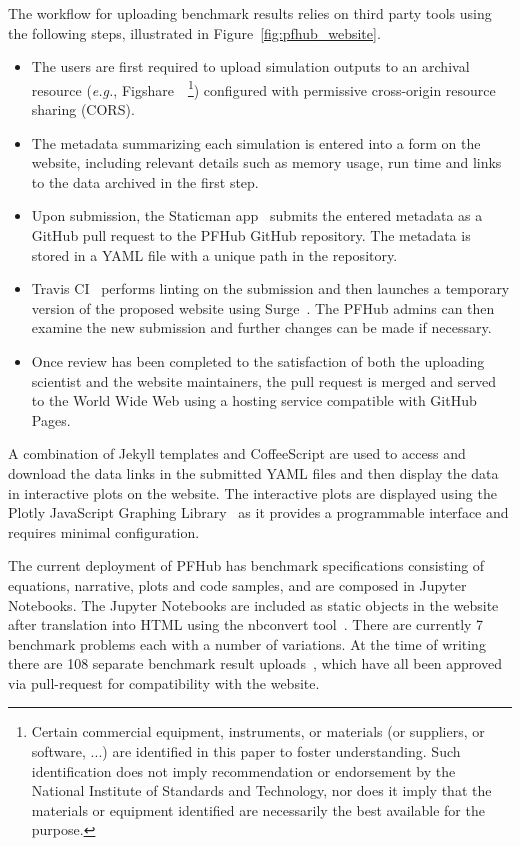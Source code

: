 \documentclass{jors}
\begin{document}
The workflow for uploading benchmark results relies on third party
tools using the following steps, illustrated in
Figure~\ref{fig:pfhub_website}.
\begin{itemize}
  \item The users are first required to upload simulation outputs to
    an archival resource (\emph{e.g.},
    Figshare~\cite{figshare}~\footnote{Certain commercial equipment,
      instruments, or materials (or suppliers, or software, ...) are
      identified in this paper to foster understanding. Such
      identification does not imply recommendation or endorsement by
      the National Institute of Standards and Technology, nor does it
      imply that the materials or equipment identified are necessarily
      the best available for the purpose.\label{disclaimer}})
    configured with permissive cross-origin resource sharing (CORS).
  \item The metadata summarizing each simulation is entered into a
    form on the website, including relevant details such as memory
    usage, run time and links to the data archived in the first step.
  \item Upon submission, the Staticman app~\cite{staticman} submits
    the entered metadata as a GitHub pull request to the PFHub GitHub
    repository.  The metadata is stored in a YAML file with a unique
    path in the repository.
  \item Travis CI~\cite{travis} performs linting on the submission and
    then launches a temporary version of the proposed website using
    Surge~\cite{surge}. The PFHub admins can then examine the new
    submission and further changes can be made if necessary.
  \item Once review has been completed to the satisfaction of both the
    uploading scientist and the website maintainers, the pull request
    is merged and served to the World Wide Web using a hosting service
    compatible with GitHub Pages.
\end{itemize}
A combination of Jekyll templates and CoffeeScript are used to access
and download the data links in the submitted YAML files and then
display the data in interactive plots on the website. The interactive
plots are displayed using the Plotly JavaScript Graphing
Library~\cite{plotly} as it provides a programmable interface and
requires minimal configuration.

The current deployment of PFHub has benchmark specifications
consisting of equations, narrative, plots and code samples, and are
composed in Jupyter Notebooks. The Jupyter Notebooks are included as
static objects in the website after translation into HTML using the
nbconvert tool~\cite{jupyter}. There are currently 7 benchmark
problems each with a number of variations. At the time of writing
there are 108 separate benchmark result uploads~\cite{pfhub}, which
have all been approved via pull-request for compatibility with the
website.
\end{document}
